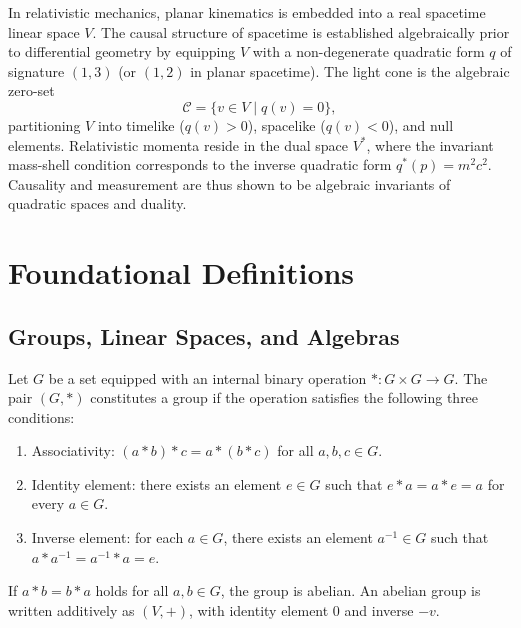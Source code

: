 \documentclass[11pt,a4paper]{article}
\begin{document}
In relativistic mechanics, planar kinematics is embedded into a real
spacetime linear space $V$.
The causal structure of spacetime is established algebraically prior to
differential geometry by equipping $V$ with a non-degenerate quadratic form
$q$ of signature $(1, 3)$ (or $(1, 2)$ in planar spacetime).
The light cone is the algebraic zero-set
\begin{equation}
  \mathcal{C} = \{ v \in V \mid q(v) = 0 \},
\end{equation}
partitioning $V$ into timelike ($q(v) > 0$), spacelike ($q(v) < 0$), and
null elements.
Relativistic momenta reside in the dual space $V^*$, where the invariant
mass-shell condition corresponds to the inverse quadratic form $q^*(p) = m^2
c^2$.
Causality and measurement are thus shown to be algebraic invariants of
quadratic spaces and duality.

\section{Foundational Definitions}
\label{sec:definitions}

\subsection{Groups, Linear Spaces, and Algebras}
\label{subsec:linear_spaces}

Let $G$ be a set equipped with an internal binary operation
$* : G \times G \to G$.
The pair $(G, *)$ constitutes a group if the operation satisfies the
following three conditions:
\begin{enumerate}
  \item[$\mathcal{G}_1$] Associativity: $(a * b) * c = a * (b * c)$ for all $a,
    b, c \in G$.
  \item[$\mathcal{G}_2$] Identity element: there exists an element $e \in G$
    such that $e * a = a * e = a$ for every $a \in G$.
  \item[$\mathcal{G}_3$] Inverse element: for each $a \in G$, there exists an
    element $a^{-1} \in G$ such that $a * a^{-1} = a^{-1} * a = e$.
\end{enumerate}
If $a * b = b * a$ holds for all $a, b \in G$, the group is abelian.
An abelian group is written additively as $(V, +)$, with identity element $0$
and inverse $-v$.
\end{document}

